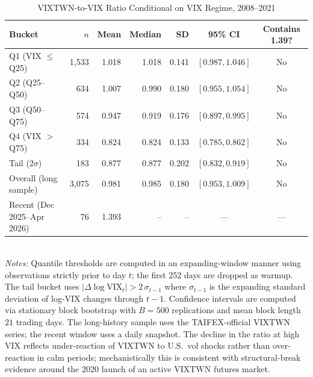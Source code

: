 \begin{table}[!htbp]
\centering
\caption{VIXTWN-to-VIX Ratio Conditional on VIX Regime, 2008--2021}
\label{tab:ratio_linearity}
\small
\begin{tabular}{lrrrrcc}
\toprule
Bucket & $n$ & Mean & Median & SD & 95\% CI & Contains 1.39? \\
\midrule
Q1 (VIX $\le$ Q25) & 1{,}533 & 1.018 & 1.018 & 0.141 & $[0.987, 1.046]$ & No \\
Q2 (Q25--Q50)      &   634 & 1.007 & 0.990 & 0.180 & $[0.955, 1.054]$ & No \\
Q3 (Q50--Q75)      &   574 & 0.947 & 0.919 & 0.176 & $[0.897, 0.995]$ & No \\
Q4 (VIX $>$ Q75)   &   334 & 0.824 & 0.824 & 0.133 & $[0.785, 0.862]$ & No \\
Tail ($2\sigma$)   &   183 & 0.877 & 0.877 & 0.202 & $[0.832, 0.919]$ & No \\
\midrule
Overall (long sample) & 3{,}075 & 0.981 & 0.985 & 0.180 & $[0.953, 1.009]$ & No \\
Recent (Dec 2025--Apr 2026) &  76 & 1.393 &     -- &     -- & --- & --- \\
\bottomrule
\end{tabular}
\smallskip
\\
\small \textit{Notes:} Quantile thresholds are computed in an
expanding-window manner using observations strictly prior to day $t$;
the first 252 days are dropped as warmup. The tail bucket uses
$|\Delta \log \text{VIX}_t| > 2\,\sigma_{t-1}$ where $\sigma_{t-1}$ is the
expanding standard deviation of log-VIX changes through $t-1$. Confidence
intervals are computed via stationary block bootstrap
\citep{politis1994} with $B=500$ replications and mean block
length $21$ trading days. The long-history sample uses the TAIFEX-official
VIXTWN series; the recent window uses a daily snapshot. The decline
in the ratio at high VIX reflects under-reaction of VIXTWN to U.S.\
vol shocks rather than over-reaction in calm periods; mechanistically
this is consistent with structural-break evidence around the 2020 launch
of an active VIXTWN futures market.
\end{table}

